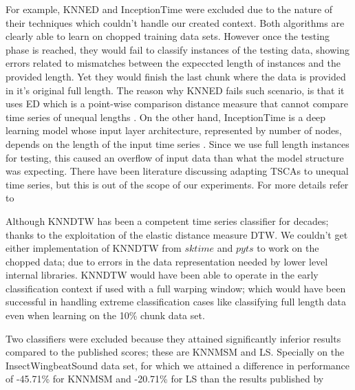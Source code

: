 For example, KNNED and InceptionTime were excluded due to the nature of their techniques which couldn't handle our created context.
Both algorithms are clearly able to learn on chopped training data sets.
However once the testing phase is reached, they would fail to classify instances of the testing data,
showing errors related to mismatches between the expeccted length of instances and the provided length.
Yet they would finish the last chunk where the data is provided in it's original full length.
The reason why KNNED fails such scenario, is that it uses ED which is a point-wise comparison distance measure that cannot compare time series of unequal lengths \cite{tan2019time}.
On the other hand, InceptionTime is a deep learning model whose input layer architecture, represented by number of nodes, depends on the length of the input time series \cite{fawaz2019deepreview}.
Since we use full length instances for testing, this caused an overflow of input data than what the model structure was expecting.
There have been literature discussing adapting TSCAs to unequal time series, but this is out of the scope of our experiments.
For more details refer to \cite{caiado2009comparison, tan2019time, fawaz2019deepreview}


Although KNNDTW has been a competent time series classifier for decades; thanks to the exploitation of the elastic distance measure DTW.
We couldn't get either implementation of KNNDTW from $sktime$ and $pyts$ to work on the chopped data; due to errors in the data representation needed by lower level internal libraries.
KNNDTW would have been able to operate in the early classification context if used with a full warping window; which would have been successful in handling extreme classification cases like classifying full length data
even when learning on the 10\% chunk data set.


Two classifiers were excluded because they attained significantly inferior results compared to the published scores; these are KNNMSM and LS.
Specially on the InsectWingbeatSound data set, for which we attained a difference in performance of -45.71\% for KNNMSM and -20.71\% for LS than the results published by \cite{bagnall2017great}

